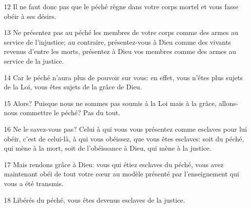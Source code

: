 
12 Il ne faut donc pas que le péché règne dans votre corps mortel et vous fasse obéir à ses désirs.

13 Ne présentez pas au péché les membres de votre corps comme des armes au service de l’injustice; au contraire, présentez-vous à Dieu comme des vivants revenus d’entre les morts, présentez à Dieu vos membres comme des armes au service de la justice.

14 Car le péché n’aura plus de pouvoir sur vous: en effet, vous n’êtes plus sujets de la Loi, vous êtes sujets de la grâce de Dieu.

15 Alors? Puisque nous ne sommes pas soumis à la Loi mais à la grâce, allons-nous commettre le péché? Pas du tout.

16 Ne le savez-vous pas? Celui à qui vous vous présentez comme esclaves pour lui obéir, c’est de celui-là, à qui vous obéissez, que vous êtes esclaves: soit du péché, qui mène à la mort, soit de l’obéissance à Dieu, qui mène à la justice.

17 Mais rendons grâce à Dieu: vous qui étiez esclaves du péché, vous avez maintenant obéi de tout votre cœur au modèle présenté par l’enseignement qui vous a été transmis.

18 Libérés du péché, vous êtes devenus esclaves de la justice.